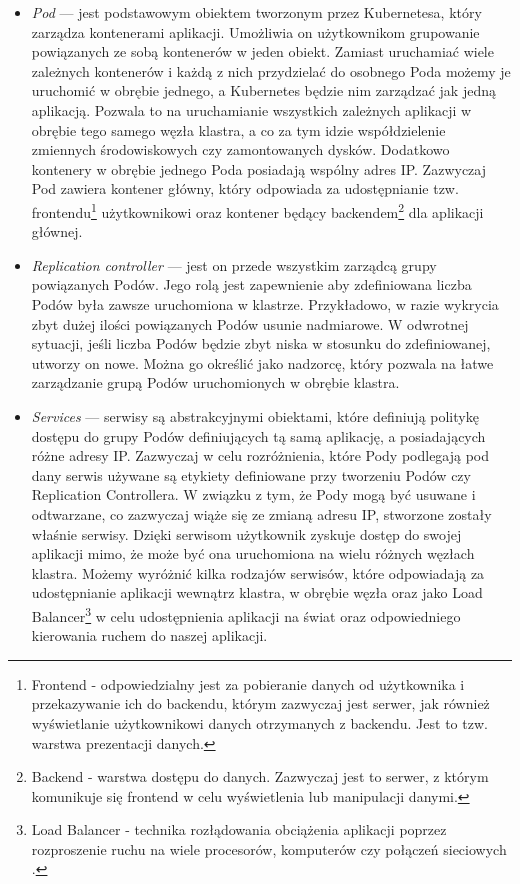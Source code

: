 \documentclass[12pt]{report}
\begin{document}
{\begin{itemize}
\item{{\it Pod} --- jest podstawowym obiektem tworzonym przez Kubernetesa, który zarządza kontenerami aplikacji. Umożliwia on użytkownikom grupowanie powiązanych ze sobą kontenerów w jeden obiekt. Zamiast uruchamiać wiele zależnych kontenerów i każdą z nich przydzielać do osobnego Poda możemy je uruchomić w obrębie jednego, a Kubernetes będzie nim zarządzać jak jedną aplikacją. Pozwala to na uruchamianie wszystkich zależnych aplikacji w obrębie tego samego węzła klastra, a co za tym idzie współdzielenie zmiennych środowiskowych czy zamontowanych dysków. Dodatkowo kontenery w obrębie jednego Poda posiadają wspólny adres IP. Zazwyczaj Pod zawiera kontener główny, który odpowiada za udostępnianie tzw. frontendu\footnote{Frontend - odpowiedzialny jest za pobieranie danych od użytkownika i przekazywanie ich do backendu, którym zazwyczaj jest serwer, jak również wyświetlanie użytkownikowi danych otrzymanych z backendu. Jest to tzw. warstwa prezentacji danych.} użytkownikowi oraz kontener będący backendem\footnote{Backend - warstwa dostępu do danych. Zazwyczaj jest to serwer, z którym komunikuje się frontend w celu wyświetlenia lub manipulacji danymi.} dla aplikacji głównej.}

\item{{\it Replication controller} --- jest on przede wszystkim zarządcą grupy powiąza\-nych Podów. Jego rolą jest zapewnienie aby zdefiniowana liczba Podów była zawsze uruchomiona w klastrze. Przykładowo, w razie wykrycia zbyt dużej ilości powiązanych Podów usunie nadmiarowe. W odwrotnej sytuacji, jeśli liczba Podów będzie zbyt niska w stosunku do zdefiniowanej, utworzy on nowe. Można go określić jako nadzorcę, który pozwala na łatwe zarządzanie grupą Podów uruchomionych w obrębie klastra.}

\item{{\it Services} --- serwisy są abstrakcyjnymi obiektami, które definiują politykę dostępu do grupy Podów definiujących tą samą aplikację, a posiadających różne adresy IP. Zazwyczaj w celu rozróżnienia, które Pody podlegają pod dany serwis używane są etykiety definiowane przy tworzeniu Podów czy Replication Controllera. W związku z tym, że Pody mogą być usuwane i odtwarzane, co zazwyczaj wiąże się ze zmianą adresu IP, stworzone zostały właśnie serwisy. Dzięki serwisom użytkownik zyskuje dostęp do swojej aplikacji mimo, że może być ona uruchomiona na wielu różnych węzłach klastra. Możemy wyróżnić kilka rodzajów serwisów, które odpowiadają za udostępnianie aplikacji wewnątrz klastra, w obrębie węzła oraz jako Load Balancer\footnote{Load Balancer - technika rozłądowania obciążenia aplikacji poprzez rozproszenie ruchu na wiele procesorów, komputerów czy połączeń sieciowych \cite{cloud}.} w celu udostępnienia aplikacji na świat oraz odpowiedniego kierowania ruchem do naszej aplikacji.}
\end{itemize}

}
\end{document}
